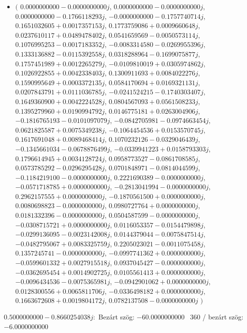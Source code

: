 \documentclass[14pt,a4paper]{article}
\begin{document}
\begin{itemize}
\item
$\big($
$0.0000000000-0.0000000000j$, $0.0000000000-0.0000000000j$, $0.0000000000-0.1766118293j$, $-0.0000000000-0.1757740714j$, $0.1651032605+0.0017357153j$, $0.1773759086+0.0009660648j$, $0.0237610117+0.0489478402j$, $0.0541659569-0.0050573114j$, $0.1076995253-0.0017183352j$, $-0.0083314580-0.0269955396j$, $0.1333136882-0.0115392558j$, $0.0318288964-0.1699075877j$, $0.1757451989+0.0012265279j$, $-0.0109810019+0.0305974862j$, $0.1026922855+0.0042338403j$, $0.1300911693+0.0084022276j$, $0.1590995649+0.0003372135j$, $0.0584170694+0.0169321131j$, $0.0207843791+0.0111036785j$, $-0.0241524215-0.1740303407j$, $0.1649360900+0.0042224528j$, $0.0804567093+0.0561508233j$, $0.1395279960+0.0190994792j$, $0.0146775181+0.0263004906j$, $-0.1816765193-0.0101097079j$, $-0.0842705981-0.0974663454j$, $0.0621825587+0.0075349238j$, $-0.1064454536+0.0153570745j$, $0.1617691048+0.0089468414j$, $0.1070232126-0.0329046439j$, $-0.1345661034-0.0678876499j$, $-0.0339941223+0.0158793303j$, $0.1796614945+0.0034128724j$, $0.0958773527-0.0861708585j$, $0.0573785292-0.0296295428j$, $0.0701848971-0.0814044599j$, $-0.1184219100-0.0000000000j$, $0.2221690389-0.0000000000j$, $-0.0571718785+0.0000000000j$, $-0.2813041994-0.0000000000j$, $0.2962157555+0.0000000000j$, $-0.1870561500+0.0000000000j$, $0.0080698823-0.0000000000j$, $0.0980727764+0.0000000000j$, $0.0181332396-0.0000000000j$, $0.0504587599-0.0000000000j$, $-0.0308715721+0.0000000000j$, $0.0116053357-0.0154479898j$, $-0.0299136095-0.0023142008j$, $0.0144379044-0.0075847514j$, $-0.0482795067+0.0083325759j$, $0.2205023021-0.0011075458j$, $0.1357245741-0.0000000000j$, $-0.0997741362+0.0000000000j$, $-0.0599601332+0.0027915518j$, $0.0937045427-0.0000000000j$, $-0.0362695454+0.0014902725j$, $0.0105561413+0.0000000000j$, $-0.0096434536-0.0075365981j$, $-0.0942901062+0.0000000000j$, $0.0128300556+0.0065811706j$, $-0.0336498182+0.0000000000j$, $0.1663672608+0.0019804172j$, $0.0782137508-0.0000000000j$
$\big)$
\end{itemize}
$0.5000000000-0.8660254038j$:\
Bezárt szög: $-60.0000000000$ \
360 / bezárt szög: $-6.0000000000$\
\end{document}
